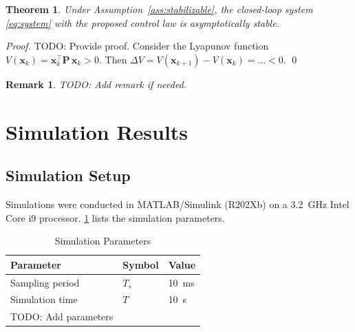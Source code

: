 \documentclass[journal]{IEEEtran}
\newtheorem{theorem}{Theorem}
\newtheorem{remark}{Remark}
\newcommand{\bx}{\bm{x}}          %
\newcommand{\bP}{\bm{P}}          %
\newcommand{\T}{^{\top}}           %
\begin{document}
\begin{theorem}
  \label{thm:stability}
  Under Assumption~\ref{ass:stabilizable}, the closed-loop system
  \eqref{eq:system} with the proposed control law is asymptotically stable.
\end{theorem}
\begin{proof}
  TODO: Provide proof.
  Consider the Lyapunov function $V(\bx_k) = \bx_k\T\bP\,\bx_k > 0$.
  Then $\Delta V = V(\bx_{k+1}) - V(\bx_k) = \ldots < 0$. \qed
\end{proof}

\begin{remark}
  TODO: Add remark if needed.
\end{remark}


\section{Simulation Results}
\label{sec:simulation}

\subsection{Simulation Setup}

Simulations were conducted in MATLAB/Simulink (R202Xb) on a
\SI{3.2}{\giga\hertz} Intel Core i9 processor.
\cref{tab:sim_params} lists the simulation parameters.

\begin{table}[htbp]
  \caption{Simulation Parameters}
  \label{tab:sim_params}
  \centering
  \begin{tabular}{lll}
    \toprule
    Parameter & Symbol & Value \\
    \midrule
    Sampling period  & $T_s$ & \SI{10}{\milli\second} \\
    Simulation time  & $T$   & \SI{10}{\second} \\
    TODO: Add parameters & & \\
    \bottomrule
  \end{tabular}
\end{table}
\end{document}
